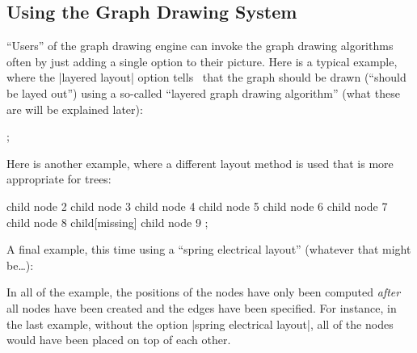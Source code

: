 \subsection{Using the Graph Drawing System}

``Users'' of the graph drawing engine can invoke the graph
drawing algorithms often by just adding a single option to their
picture. Here is a typical example, where the |layered layout| option
tells \tikzname\ that the graph should be drawn (``should be layed
out'') using a so-called ``layered graph drawing algorithm'' (what
these are will be explained later):
\begin{codeexample}[]
\tikz [>=spaced stealth']
  ;
\end{codeexample}
Here is another example, where a different layout method is used
that is more appropriate for trees:
\begin{codeexample}[]
\tikz [grow'=up, binary tree layout, nodes={circle,draw}]
  child { node {2}
    child { node {3} }
    child { node {4}
      child { node {5} }
      child { node {6} }
    }
  }
  child { node {7}
    child { node {8}
      child[missing]
      child { node {9} }
    }
  };
\end{codeexample}
A final example, this time using a ``spring electrical layout''
(whatever that might be\dots):
\begin{codeexample}[]
\end{codeexample}
In all of the example, the positions of the nodes have only been
computed \emph{after} all nodes have been created and the edges have
been specified. For instance, in the last example, without the
option |spring electrical layout|, all of the nodes would have been
placed on top of each other.


